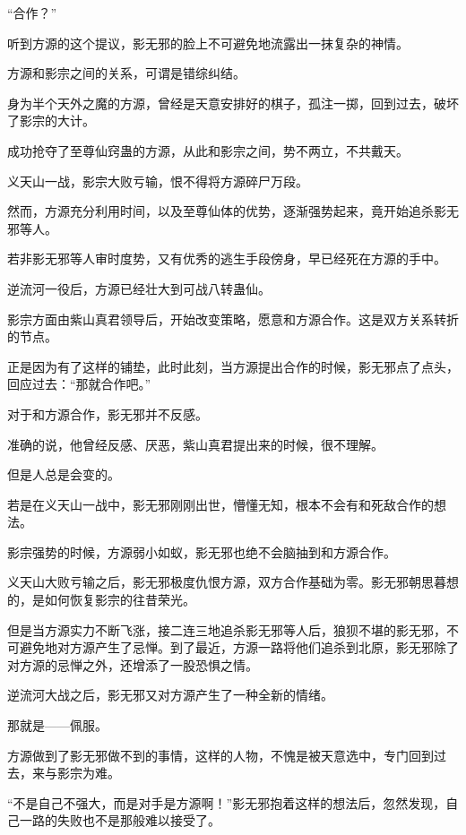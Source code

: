 
\begin{this_body}

“合作？”

听到方源的这个提议，影无邪的脸上不可避免地流露出一抹复杂的神情。

方源和影宗之间的关系，可谓是错综纠结。

身为半个天外之魔的方源，曾经是天意安排好的棋子，孤注一掷，回到过去，破坏了影宗的大计。

成功抢夺了至尊仙窍蛊的方源，从此和影宗之间，势不两立，不共戴天。

义天山一战，影宗大败亏输，恨不得将方源碎尸万段。

然而，方源充分利用时间，以及至尊仙体的优势，逐渐强势起来，竟开始追杀影无邪等人。

若非影无邪等人审时度势，又有优秀的逃生手段傍身，早已经死在方源的手中。

逆流河一役后，方源已经壮大到可战八转蛊仙。

影宗方面由紫山真君领导后，开始改变策略，愿意和方源合作。这是双方关系转折的节点。

正是因为有了这样的铺垫，此时此刻，当方源提出合作的时候，影无邪点了点头，回应过去：“那就合作吧。”

对于和方源合作，影无邪并不反感。

准确的说，他曾经反感、厌恶，紫山真君提出来的时候，很不理解。

但是人总是会变的。

若是在义天山一战中，影无邪刚刚出世，懵懂无知，根本不会有和死敌合作的想法。

影宗强势的时候，方源弱小如蚁，影无邪也绝不会脑抽到和方源合作。

义天山大败亏输之后，影无邪极度仇恨方源，双方合作基础为零。影无邪朝思暮想的，是如何恢复影宗的往昔荣光。

但是当方源实力不断飞涨，接二连三地追杀影无邪等人后，狼狈不堪的影无邪，不可避免地对方源产生了忌惮。到了最近，方源一路将他们追杀到北原，影无邪除了对方源的忌惮之外，还增添了一股恐惧之情。

逆流河大战之后，影无邪又对方源产生了一种全新的情绪。

那就是——佩服。

方源做到了影无邪做不到的事情，这样的人物，不愧是被天意选中，专门回到过去，来与影宗为难。

“不是自己不强大，而是对手是方源啊！”影无邪抱着这样的想法后，忽然发现，自己一路的失败也不是那般难以接受了。


\end{this_body}
